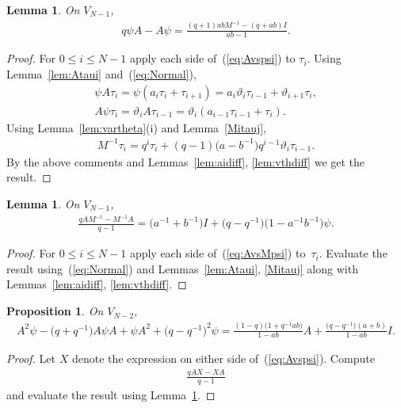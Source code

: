 \documentclass[pdftex]{sigma}
\numberwithin{equation}{section}
\newtheorem{Lemma}[Theorem]{Lemma}
\newtheorem{Proposition}[Theorem]{Proposition}
\begin{document}
\begin{Lemma}\label{lem:Avspsi}
On $V_{N-1}$,
\begin{gather}
q \psi A - A \psi = \frac{ (q+1)ab M^{-1} - (q+ab)I}{ab-1}.\label{eq:Avspsi}
\end{gather}
\end{Lemma}
\begin{proof}
For $0 \leq i \leq N-1$ apply each side of~(\ref{eq:Avspsi}) to $\tau_i$.
Using
Lemma~\ref{lem:Ataui} and~(\ref{eq:Normal}),
\begin{gather*}
\psi A \tau_i = \psi (a_i \tau_i + \tau_{i+1}) =a_i \vartheta_i \tau_{i-1} + \vartheta_{i+1} \tau_i,\\
A \psi \tau_i = \vartheta_i A \tau_{i-1} = \vartheta_i (a_{i-1} \tau_{i-1}+ \tau_i).
\end{gather*}
Using Lemma~\ref{lem:vartheta}(i)
and Lemma~\ref{Mitauj},
\begin{gather*}
M^{-1} \tau_i = q^i \tau_i + (q-1)\big(a-b^{-1}\big)q^{i-1}\vartheta_i\tau_{i-1}.
\end{gather*}
By the above comments and Lemmas~\ref{lem:aidiff},
\ref{lem:vthdiff} we get the result.
\end{proof}

\begin{Lemma}\label{lem:AvsMpsi}
On $V_{N-1}$,
\begin{gather}\label{eq:AvsMpsi}
\frac{ q A M^{-1} - M^{-1} A}{q-1} =
\big(a^{-1} + b^{-1}\big) I+
\big(q-q^{-1}\big)\big(1-a^{-1} b^{-1}\big)\psi.
\end{gather}
\end{Lemma}
\begin{proof} For $0 \leq i \leq N-1$ apply each side
of~(\ref{eq:AvsMpsi}) to~$\tau_i$. Evaluate the result
using~(\ref{eq:Normal}) and Lemmas~\ref{lem:Ataui},
\ref{Mitauj}
along with Lemmas~\ref{lem:aidiff}, \ref{lem:vthdiff}.
\end{proof}

\begin{Proposition}\label{prop:AvPsi}
On $V_{N-2}$,
\begin{gather*}
A^2 \psi - \big(q+q^{-1}\big)A \psi A + \psi A^2+ \big(q-q^{-1}\big)^2 \psi =
\frac{ (1-q)\big(1+q^{-1} ab\big)}{1-ab} A + \frac{\big(q-q^{-1}\big)(a+b)}{1-ab} I.
\end{gather*}
\end{Proposition}
\begin{proof} Let $X$ denote the expression on either side
of~(\ref{eq:Avspsi}).
Compute
\begin{gather*}
\frac{q A X - X A}{q-1}
\end{gather*}
and evaluate the result using Lemma~\ref{lem:AvsMpsi}.
\end{proof}
\end{document}
